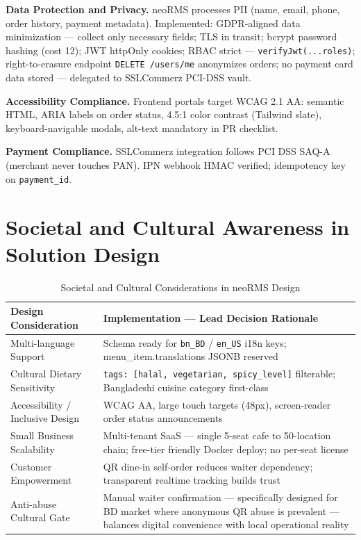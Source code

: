 \textbf{Data Protection and Privacy.} neoRMS processes PII (name, email, phone, order history, payment metadata). Implemented: GDPR-aligned data minimization --- collect only necessary fields; TLS in transit; bcrypt password hashing (cost 12); JWT httpOnly cookies; RBAC strict --- \texttt{verifyJwt(...roles)}; right-to-erasure endpoint \texttt{DELETE /users/me} anonymizes orders; no payment card data stored --- delegated to SSLCommerz PCI-DSS vault.

\textbf{Accessibility Compliance.} Frontend portals target WCAG 2.1 AA: semantic HTML, ARIA labels on order status, 4.5:1 color contrast (Tailwind slate), keyboard-navigable modals, alt-text mandatory in PR checklist.

\textbf{Payment Compliance.} SSLCommerz integration follows PCI DSS SAQ-A (merchant never touches PAN). IPN webhook HMAC verified; idempotency key on \texttt{payment\_id}.

\section{Societal and Cultural Awareness in Solution Design}

\begin{table}[H]
\centering
\caption{Societal and Cultural Considerations in neoRMS Design}
\label{tab:societal}
\begin{tabularx}{\textwidth}{@{}p{}X@{}}
\toprule
\textbf{Design Consideration} & \textbf{Implementation --- Lead Decision Rationale} \\
\midrule
Multi-language Support & Schema ready for \texttt{bn\_BD} / \texttt{en\_US} i18n keys; menu\_item.translations JSONB reserved \\
Cultural Dietary Sensitivity & \texttt{tags: [halal, vegetarian, spicy\_level]} filterable; Bangladeshi cuisine category first-class \\
Accessibility / Inclusive Design & WCAG AA, large touch targets (48px), screen-reader order status announcements \\
Small Business Scalability & Multi-tenant SaaS --- single \texttildelow{} 5-seat cafe to 50-location chain; free-tier friendly Docker deploy; no per-seat license \\
Customer Empowerment & QR dine-in self-order reduces waiter dependency; transparent realtime tracking builds trust \\
Anti-abuse Cultural Gate & Manual waiter confirmation --- specifically designed for BD market where anonymous QR abuse is prevalent --- balances digital convenience with local operational reality \\
\bottomrule
\end{tabularx}
\end{table}

